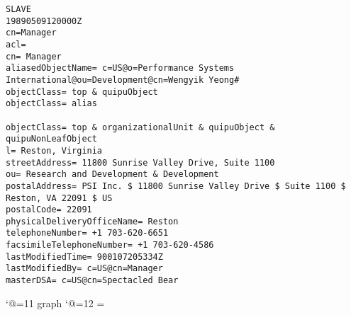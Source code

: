 
\scriptsize
\begin{verbatim}
SLAVE
19890509120000Z
cn=Manager
acl=
cn= Manager
aliasedObjectName= c=US@o=Performance Systems International@ou=Development@cn=Wengyik Yeong#
objectClass= top & quipuObject
objectClass= alias

objectClass= top & organizationalUnit & quipuObject & quipuNonLeafObject
l= Reston, Virginia
streetAddress= 11800 Sunrise Valley Drive, Suite 1100
ou= Research and Development & Development
postalAddress= PSI Inc. $ 11800 Sunrise Valley Drive $ Suite 1100 $ Reston, VA 22091 $ US
postalCode= 22091
physicalDeliveryOfficeName= Reston
telephoneNumber= +1 703-620-6651
facsimileTelephoneNumber= +1 703-620-4586
lastModifiedTime= 900107205334Z
lastModifiedBy= c=US@cn=Manager
masterDSA= c=US@cn=Spectacled Bear

\end{verbatim}

\catcode`@=11
\expandafter\ifx\csname graph\endcsname\relax {}\box\chardef\insc@unt\graph\fi
\catcode`@=12
\setbox\graph=\empty
